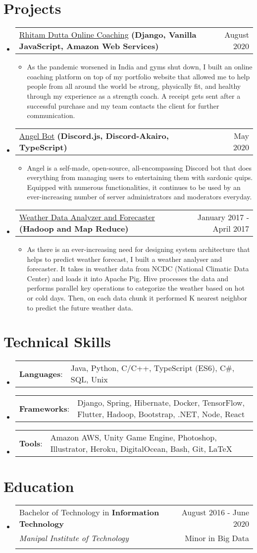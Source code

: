 \documentclass[letterpaper,11pt]{article}
\makeatletter
\newcommand{\sectionStart}{
  \begin{itemize}[label={},leftmargin=0in]
}
\newcommand{\sectionEnd}{
  \end{itemize}
}
\newcommand{\educationItem}[5]{
  \vspace{-1pt}
  \item
  \begin{tabular*}{\textwidth}{l@{\extracolsep{\fill}}r@{}}
    {#1 in \textbf{#2}}  & {#3}\\
    {\textit{#4}} & {#5}\\\vspace{-18pt}
  \end{tabular*}
  \vspace{-5pt}
}
\newcommand{\skillItem}[2]{
  \vspace{-1pt}
  \item
  \begin{tabular*}{1.0\textwidth}{l@{}l@{}}
    {\textbf{#1}: } & {#2}
  \end{tabular*}\vspace{-17pt}
}
\newcommand{\projectHeading}[4]{
  \vspace{-1pt}
  \item
  \begin{tabular*}{1.0\textwidth}{l@{\extracolsep{\fill}}r@{}}
    \normalsize{{\href{#1}{#2}} \textbf{#3}} & #4 \\
  \end{tabular*}\vspace{-5pt}
}
\newcommand{\listStart}{\begin{itemize}}
\newcommand{\listEnd}{\end{itemize}\vspace{-5pt}}
\newcommand{\bulletItem}[1]{
  \item
  \small{
    {#1 \vspace{-1.8pt}}
  }
}
\makeatother
\begin{document}
\section{Projects}
\sectionStart
  \projectHeading
    {https://rhitamdutta.com/coaching/}
    {Rhitam Dutta Online Coaching}
    {(Django, Vanilla JavaScript, Amazon Web Services)}
    {August 2020}
  \listStart
    \bulletItem
      {As the pandemic worsened in India and gyms shut down, I built an online coaching platform on top of my portfolio website that allowed me to help people from all around the world be strong, physically fit, and healthy through my experience as a strength coach. A receipt gets sent after a successful purchase and my team contacts the client for further communication.}
  \listEnd
  \projectHeading
    {https://github.com/exthazor/angel}
    {Angel Bot}
    {(Discord.js, Discord-Akairo, TypeScript)}
    {May 2020}
  \listStart
    \bulletItem
    {Angel is a self-made, open-source, all-encompassing Discord bot that does everything from managing users to entertaining them with sardonic quips. Equipped with numerous functionalities, it continues to be used by an ever-increasing number of server administrators and moderators everyday.}
  \listEnd
  \projectHeading
    {https://drive.google.com/file/d/12v8wYAPJ4aZ6rGTGNL5RerHWSN13arj5/view?usp=sharing}
    {Weather Data Analyzer and Forecaster}
    {(Hadoop and Map Reduce)}
    {January 2017 - April 2017}
  \listStart
    \bulletItem
      {As there is an ever-increasing need for designing system architecture that helps to predict weather forecast, I built a weather analyser and forecaster. It takes in weather data from NCDC (National Climatic Data Center) and loads it into Apache Pig. Hive processes the data and performs parallel key operations to categorize the weather based on hot or cold days. Then, on each data chunk it performed K nearest neighbor to predict the future weather data.}
  \listEnd
\sectionEnd

\section{Technical Skills}
\sectionStart
  \skillItem
    {Languages}
    {Java, Python, C/C++, TypeScript (ES6), C\#, SQL, Unix}
  \skillItem
    {Frameworks}
    {Django, Spring, Hibernate, Docker, TensorFlow, Flutter, Hadoop, Bootstrap, .NET, Node, React}
  \skillItem
    {Tools}
    {Amazon AWS, Unity Game Engine, Photoshop, Illustrator, Heroku, DigitalOcean, Bash, Git, \LaTeX\ }
  \vspace{3pt}
\sectionEnd

\section{Education}
\sectionStart
  \educationItem
    {Bachelor of Technology} 
    {Information Technology} 
    {August 2016 - June 2020}
    {Manipal Institute of Technology} 
    {Minor in Big Data}
\sectionEnd
\end{document}
